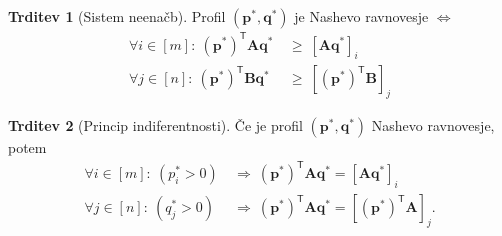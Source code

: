 \documentclass[11pt]{article}
\newcommand{\T}{\textsf{T}}
\newcommand{\p}{\mathbf{p}}
\newcommand{\q}{\mathbf{q}}
\renewcommand{\AA}{\mathbf{A}}
\newcommand{\BB}{\mathbf{B}}
\theoremstyle{definition}
\theoremstyle{definition}
\newtheorem{trditev}{Trditev}[section]
\theoremstyle{definition}
\theoremstyle{definition}
\begin{document}
\begin{trditev}[Sistem neenačb]

Profil $(\p^*,\q^*)$ je Nashevo ravnovesje $\iff$
\begin{align*}
\forall i \in [m]: ~(\p^*)^\T \AA \q^* ~&\geq~ [\AA\q^*]_i \\
\forall j \in [n]: ~(\p^*)^\T \BB \q^* ~&\geq~ [(\p^*)^\T \BB]_j
\end{align*}

\end{trditev}
\vspace{0.5cm}

\begin{trditev}[Princip indiferentnosti]

Če je profil $(\p^*, \q^*)$ Nashevo ravnovesje, potem
\begin{align*}
\forall i \in [m]: ~(p_i^* > 0) ~&\Rightarrow~ (\p^*)^\T \AA \q^* = [\AA\q^*]_i \\
\forall j \in [n]: ~(q_j^* > 0) ~&\Rightarrow~ (\p^*)^\T \AA \q^* = [(\p^*)^\T \AA]_j.
\end{align*}

\end{trditev}
\vspace{0.5cm}


\pagebreak

\end{document}
